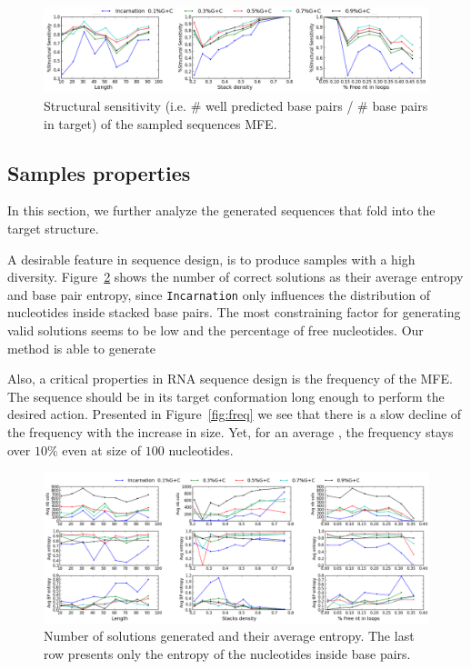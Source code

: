 \begin{figure}[ht!]
 	\centering
	\includegraphics[scale=0.45]{Figures/rnastrand_clustered_rnainverse_100samples_struct_sens.png}
	\caption{Structural sensitivity (i.e. $\#$ well predicted base pairs / $\#$ base pairs in target) of the sampled sequences MFE. }
	\label{fig:ss_sens}	
\end{figure}


\subsection{Samples properties}

In this section, we further analyze the generated sequences that fold into the 
target structure. 

A desirable feature in sequence design, is to produce samples with a high
diversity. Figure~\ref{fig:nb_sols_entropy} shows the number of correct
solutions as their average entropy and base pair entropy, since 
\texttt{Incarnation}  only influences the distribution of nucleotides inside 
stacked base pairs. The most constraining factor for generating valid
 solutions seems to be  low \GCContent and the percentage of free nucleotides. Our method is able to generate 

Also, a critical properties in RNA sequence design is 
the frequency of the MFE. 
The sequence should be in its target conformation long enough to
perform the desired action. Presented in Figure~\ref{fig:freq} we see that
there is a slow decline of the frequency with the increase in size. Yet,
for an average \GCContent, the frequency stays over $10\%$ even
at size of $100$ nucleotides.


\begin{figure}[ht!]
	\centering
	\includegraphics[width=\textwidth]{Figures/nb_sols_entropy.png}
	\caption{Number of solutions generated and their average entropy. 
	The last row presents only the entropy of the nucleotides inside base 
	pairs.}
	\label{fig:nb_sols_entropy}
\end{figure}



